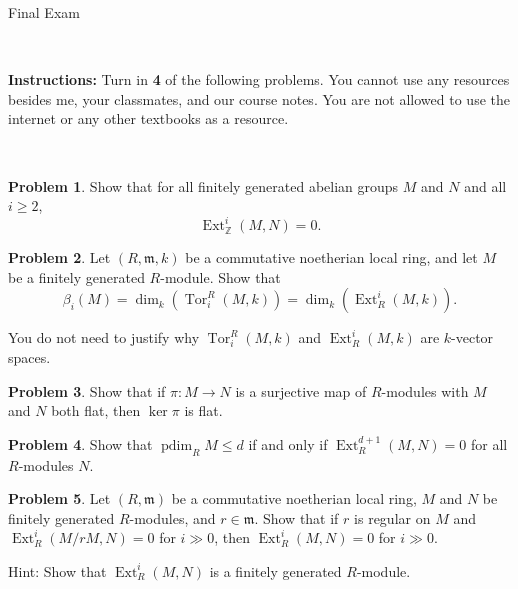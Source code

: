 \documentclass[11pt]{article}
\title{}
\date{\vspace{-0.5in}}
\DeclareMathOperator{\Tor}{Tor}
\DeclareMathOperator{\Ext}{Ext}
\DeclareMathOperator{\pdim}{pdim}
\newcommand{\m}{\mathfrak{m}}
\newcommand{\Z}{\mathbb{Z}}
\theoremstyle{definition}
\newtheorem{problem}{Problem}
\begin{document}
\thispagestyle{fancy}
\pagestyle{fancy}

\vspace{2em}

\begin{center}
	{\LARGE Final Exam}
\end{center}

\


\noindent
{\bf Instructions:}
Turn in {\bf 4} of the following problems. 
You cannot use any resources besides me, your classmates, and our course notes.
You are not allowed to use the internet or any other textbooks as a resource.

\


\begin{problem}
	Show that for all finitely generated abelian groups $M$ and $N$ and all $i \geqslant 2$,
	$$\Ext^i_\Z(M,N) = 0.$$
\end{problem}

\vfill


\begin{problem}
	Let $(R, \m, k)$ be a commutative noetherian local ring, and let $M$ be a finitely generated $R$-module. Show that
	$$\beta_i(M) = \dim_k \left( \Tor_i^R(M,k) \right) = \dim_k \left( \Ext^i_R(M,k) \right).$$
	
	\noindent
	You do not need to justify why $\Tor_i^R(M,k)$ and $\Ext^i_R(M,k)$ are $k$-vector spaces.
\end{problem}


\vfill

\begin{problem}
Show that if $\pi\!: M \to N$ is a surjective map of $R$-modules with $M$ and $N$ both flat, then $\ker \pi$ is flat.
\end{problem}


\vfill


\begin{problem}
	Show that $\pdim_R M \leqslant d$ if and only if $\Ext^{d+1}_R(M,N) = 0$ for all $R$-modules $N$.
\end{problem}

\vfill

\begin{problem}
Let $(R,\m)$ be a commutative noetherian local ring, $M$ and $N$ be finitely generated $R$-modules, and $r \in \m$. Show that if $r$ is regular on $M$ and $\Ext^i_R(M/rM,N) = 0$ for $i \gg 0$, then $\Ext^i_R(M,N) = 0$ for $i \gg 0$.

\vspace{0.5em}

	\noindent
	Hint: Show that $\Ext^i_R(M,N)$ is a finitely generated $R$-module.
\end{problem}
\end{document}
